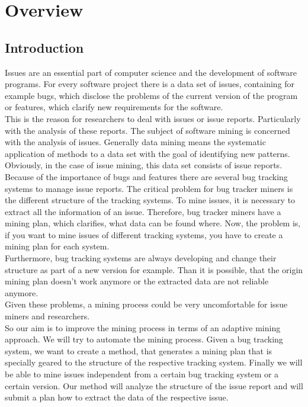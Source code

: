 \chapter{Overview}
\label{Overview}

\section{Introduction}
\label{Introduction}
Issues are an essential part of computer science and the development of software programs. For every software project there is a data set of issues, containing for example bugs, which disclose the problems of the current version of the program or features, which clarify new requirements for the software. \\ This is the reason for researchers to deal with issues or issue reports. Particularly with the analysis of these reports. The subject of software mining is concerned with the analysis of issues. Generally data mining means the systematic application of methods to a data set with the goal of identifying new patterns. Obviously, in the case of issue mining, this data set consists of issue reports. \\ Because of the importance of bugs and features there are several bug tracking systems to manage issue reports.
The critical problem for bug tracker miners is the different structure of the tracking systems. To mine issues, it is necessary to extract all the information of an issue. Therefore, bug tracker miners have a mining plan, which clarifies, what data can be found where. Now, the problem is, if you want to mine issues of different tracking systems, you have to create a mining plan for each system. \\ Furthermore, bug tracking systems are always developing and change their structure as part of a new version for example.
Than it is possible, that the origin mining plan doesn't work anymore or the extracted data are not reliable anymore. \\ Given these problems, a mining process could be very uncomfortable for issue miners and researchers. \\ So our aim is to improve the mining process in terms of an adaptive mining approach. We will try to automate the mining process. Given a bug tracking system, we want to create a method, that generates a mining plan that is specially geared to the structure of the respective tracking system. Finally we will be able to mine issues independent from a certain bug tracking system or a certain version. Our method will analyze the structure of the issue report and will submit a plan how to extract the data of the respective issue. \\ \\
